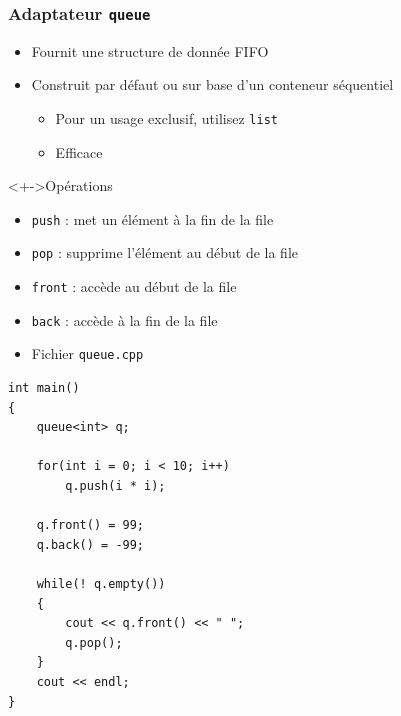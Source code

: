 \begin{frame}
\frametitle{Adaptateur \lstinline|queue|}
\begin{itemize}[<+->]
\item Fournit une structure de donnée FIFO
\item Construit par défaut ou sur base d'un conteneur séquentiel
	\begin{itemize}
	\item Pour un usage exclusif, utilisez \texttt{list}
	\item Efficace
	\end{itemize}
\end{itemize}
\begin{exampleblock}<+->{Opérations}
	\begin{itemize}[<+->]
	\item \lstinline|push| : met un élément à la fin de la file
	\item \lstinline|pop| : supprime l'élément au début de la file
	\item \lstinline|front| : accède au début de la file
	\item \lstinline|back| : accède à la fin de la file
	\end{itemize}
\end{exampleblock}
\end{frame}

\begin{frame}[containsverbatim]
\begin{itemize}
\item Fichier \texttt{queue.cpp}
\end{itemize}
\begin{lstlisting}
int main()
{	
	queue<int> q;	

	for(int i = 0; i < 10; i++)
		q.push(i * i);

	q.front() = 99;
	q.back() = -99;

	while(! q.empty())
	{
		cout << q.front() << " ";
		q.pop();
	}
	cout << endl;
}
\end{lstlisting}
\end{frame}

